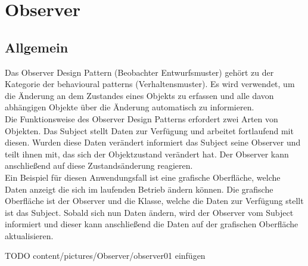 
\chapter{Observer}

\section{Allgemein}
Das Observer Design Pattern (Beobachter Entwurfsmuster) gehört zu der Kategorie der behavioural 
patterns (Verhaltensmuster). Es wird verwendet, um die Änderung an dem Zustandes eines Objekts zu
erfassen und alle davon abhängigen Objekte über die Änderung automatisch zu
informieren.\\
\newline
Die Funktionsweise des Observer Design Patterns erfordert zwei Arten von Objekten. Das Subject 
stellt Daten zur Verfügung und arbeitet fortlaufend mit diesen. Wurden diese Daten verändert
informiert das Subject seine Observer und teilt ihnen mit, das sich der Objektzustand verändert 
hat. Der Observer kann anschließend auf diese Zustandsänderung reagieren.\\
\newline
Ein Beispiel für diesen Anwendungsfall ist eine grafische Oberfläche, welche Daten anzeigt 
die sich im laufenden Betrieb ändern können. Die grafische Oberfläche ist der Observer und die 
Klasse, welche die Daten zur Verfügung stellt ist das Subject. Sobald sich nun Daten ändern, 
wird der Observer vom Subject informiert und dieser kann anschließend die Daten auf der 
grafischen Oberfläche aktualisieren.\\
\newline

TODO content/pictures/Observer/observer01 einfügen

